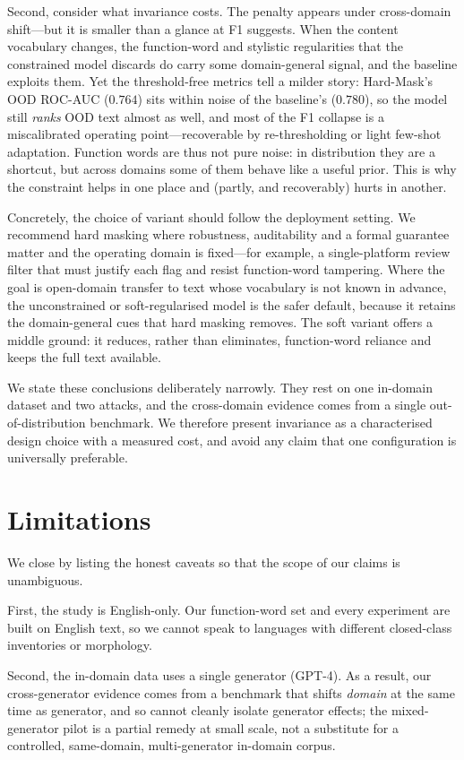 \documentclass[10pt,twocolumn]{article}
\begin{document}
Second, consider what invariance costs. The penalty appears under cross-domain shift---but it is smaller than a glance at F1 suggests. When the content vocabulary changes, the function-word and stylistic regularities that the constrained model discards do carry some domain-general signal, and the baseline exploits them. Yet the threshold-free metrics tell a milder story: Hard-Mask's OOD ROC-AUC ($0.764$) sits within noise of the baseline's ($0.780$), so the model still \emph{ranks} OOD text almost as well, and most of the F1 collapse is a miscalibrated operating point---recoverable by re-thresholding or light few-shot adaptation. Function words are thus not pure noise: in distribution they are a shortcut, but across domains some of them behave like a useful prior. This is why the constraint helps in one place and (partly, and recoverably) hurts in another.

Concretely, the choice of variant should follow the deployment setting. We recommend hard masking where robustness, auditability and a formal guarantee matter and the operating domain is fixed---for example, a single-platform review filter that must justify each flag and resist function-word tampering. Where the goal is open-domain transfer to text whose vocabulary is not known in advance, the unconstrained or soft-regularised model is the safer default, because it retains the domain-general cues that hard masking removes. The soft variant offers a middle ground: it reduces, rather than eliminates, function-word reliance and keeps the full text available.

We state these conclusions deliberately narrowly. They rest on one in-domain dataset and two attacks, and the cross-domain evidence comes from a single out-of-distribution benchmark. We therefore present invariance as a characterised design choice with a measured cost, and avoid any claim that one configuration is universally preferable.
\section{Limitations}
We close by listing the honest caveats so that the scope of our claims is unambiguous.

First, the study is English-only. Our function-word set and every experiment are built on English text, so we cannot speak to languages with different closed-class inventories or morphology.

Second, the in-domain data uses a single generator (GPT-4). As a result, our cross-generator evidence comes from a benchmark that shifts \emph{domain} at the same time as generator, and so cannot cleanly isolate generator effects; the mixed-generator pilot is a partial remedy at small scale, not a substitute for a controlled, same-domain, multi-generator in-domain corpus.
\end{document}

